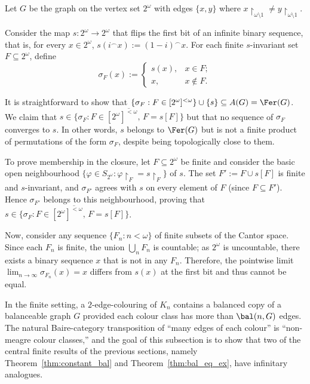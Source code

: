 \begin{example}\label{ex:aut_closure_not_seq}
    Let $G$ be the graph on the vertex set $2^\omega$ with edges $\{x,y\}$ where $x\restriction_{\omega\setminus 1}\neq y\restriction_{\omega\setminus 1}$.

    Consider the map $s\colon2^\omega\to2^\omega$ that flips the first bit of an infinite binary sequence, that is, for every $x\in2^\omega$, $s(i^\frown x):=(1-i)^\frown x$.
    For each finite $s$-invariant set $F\subseteq2^\omega$, define $$\sigma_F(x):=\begin{cases}
        s(x),&x\in F;\\
        x,&x\notin F.
    \end{cases}$$

    It is straightforward to show that $\{\sigma_F:F\in[2^\omega]^{<\omega}\}\cup\{s\}\subseteq A(G)=\Fer(G)$.
    We claim that $s\in\overline{\{\sigma_F:F\in[2^\omega]^{<\omega},\,F=s[F]\}}$ but that no sequence of $\sigma_F$ converges to $s$.
    In other words, $s$ belongs to $\Fer(G)$ but is not a finite product of permutations of the form $\sigma_F$, despite being topologically close to them.

    To prove membership in the closure, let $F\subseteq 2^\omega$ be finite and consider the basic open neighbourhood $\{\varphi\in S_{2^\omega}:\varphi\restriction_F=s\restriction_F\}$ of $s$.
    The set $F':=F\cup s[F]$ is finite and $s$-invariant, and $\sigma_{F'}$ agrees with $s$ on every element of $F$ (since $F\subseteq F'$).
    Hence $\sigma_{F'}$ belongs to this neighbourhood, proving that $s\in\overline{\{\sigma_F:F\in[2^\omega]^{<\omega},\,F=s[F]\}}$.

    Now, consider any sequence $\{F_n:n<\omega\}$ of finite subsets of the Cantor space.
    Since each $F_n$ is finite, the union $\bigcup_n F_n$ is countable; as $2^\omega$ is uncountable, there exists a binary sequence $x$ that is not in any $F_n$.
    Therefore, the pointwise limit $\lim_{n\to\infty}\sigma_{F_n}(x)=x$ differs from $s(x)$ at the first bit and thus cannot be equal.
\end{example}

In the finite setting, a $2$-edge-colouring of $K_n$ contains a balanced copy of a balanceable graph $G$ provided each colour class has more than $\bal(n,G)$ edges.
The natural Baire-category transposition of ``many edges of each colour'' is ``non-meagre colour classes,'' and the goal of this subsection is to show that two of the central finite results of the previous sections, namely Theorem~\ref{thm:constant_bal} and Theorem~\ref{thm:bal_eq_ex}, have infinitary analogues.
 
